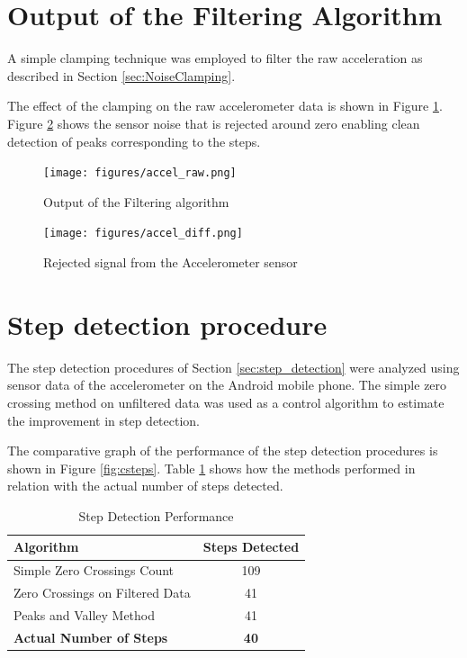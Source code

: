 \section{Output of the Filtering Algorithm}

A simple clamping technique was employed to filter the
raw acceleration as described in Section \ref{sec:NoiseClamping}.

The effect of the clamping on the raw accelerometer data is shown in 
Figure \ref{fig:accel_raw}. Figure \ref{fig:accel_diff} shows the sensor noise
that is rejected around zero enabling clean detection of peaks corresponding to
the steps.

\begin{figure}[tbph]
    \centering
    \texttt{[image: figures/accel\_raw.png]}
    \caption{Output of the Filtering algorithm \label{fig:accel_raw}}
\end{figure}

\begin{figure}[tbph]
    \centering
    \texttt{[image: figures/accel\_diff.png]}
    \caption{Rejected signal from the Accelerometer sensor \label{fig:accel_diff}}
\end{figure}


\section{Step detection procedure}

The step detection procedures of Section \ref{sec:step_detection} were analyzed
using sensor data of the accelerometer on the Android mobile phone. 
The simple zero crossing method on unfiltered data was used as a control 
algorithm to estimate the improvement in step detection.

The comparative graph of the performance of the step detection procedures 
is shown in Figure \ref{fig:csteps}. Table \ref{tbl:step_table} shows how the 
methods performed in relation with the actual number of steps detected.


\begin{table}[tbph]
\centering
\begin{tabular}{||l|c||}
\hline
\hline
\textbf{Algorithm} & \textbf{Steps Detected} \\
\hline

Simple Zero Crossings Count & 109 \\
Zero Crossings on Filtered Data & 41 \\
Peaks and Valley Method & 41 \\
\textbf{Actual Number of Steps} & \textbf{40} \\
\hline
\hline
\end{tabular}
\caption{Step Detection Performance\label{tbl:step_table}}
\end{table}

